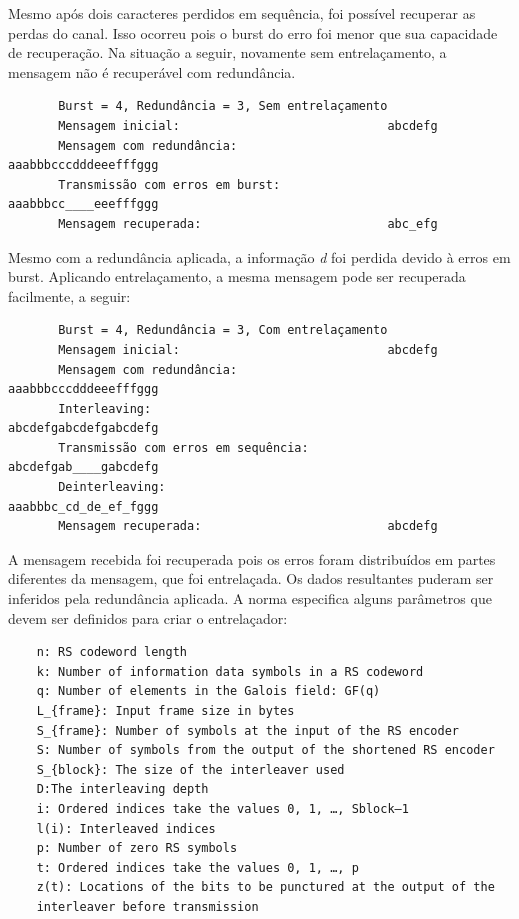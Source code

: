	Mesmo após dois caracteres perdidos em sequência, foi possível recuperar as perdas do canal. Isso ocorreu pois o burst do erro foi menor que sua capacidade de recuperação. Na situação a seguir, novamente sem entrelaçamento, a mensagem não é recuperável com redundância.
	
	\begin{verbatim}
	   Burst = 4, Redundância = 3, Sem entrelaçamento
	   Mensagem inicial:                             abcdefg
	   Mensagem com redundância:                     aaabbbcccdddeeefffggg
	   Transmissão com erros em burst:               aaabbbcc____eeefffggg
	   Mensagem recuperada:                          abc_efg
	\end{verbatim}
	
	Mesmo com a redundância aplicada, a informação \textit{d} foi perdida devido à erros em burst. Aplicando entrelaçamento, a mesma mensagem pode ser recuperada facilmente, a seguir:
	
	\begin{verbatim}
	   Burst = 4, Redundância = 3, Com entrelaçamento
	   Mensagem inicial:                             abcdefg
	   Mensagem com redundância:                     aaabbbcccdddeeefffggg
	   Interleaving:                                 abcdefgabcdefgabcdefg
	   Transmissão com erros em sequência:           abcdefgab____gabcdefg
	   Deinterleaving:                               aaabbbc_cd_de_ef_fggg
	   Mensagem recuperada:                          abcdefg
	\end{verbatim}
	
	A mensagem recebida foi recuperada pois os erros foram distribuídos em partes diferentes da mensagem, que foi entrelaçada. Os dados resultantes puderam ser inferidos pela redundância aplicada. A norma especifica alguns parâmetros que devem ser definidos para criar o entrelaçador:
	
	\begin{verbatim}
	n: RS codeword length
	k: Number of information data symbols in a RS codeword
	q: Number of elements in the Galois field: GF(q)
	L_{frame}: Input frame size in bytes
	S_{frame}: Number of symbols at the input of the RS encoder
	S: Number of symbols from the output of the shortened RS encoder
	S_{block}: The size of the interleaver used
	D:The interleaving depth
	i: Ordered indices take the values 0, 1, …, Sblock–1
	l(i): Interleaved indices
	p: Number of zero RS symbols
	t: Ordered indices take the values 0, 1, …, p
	z(t): Locations of the bits to be punctured at the output of the 
	interleaver before transmission 
	\end{verbatim}
	
